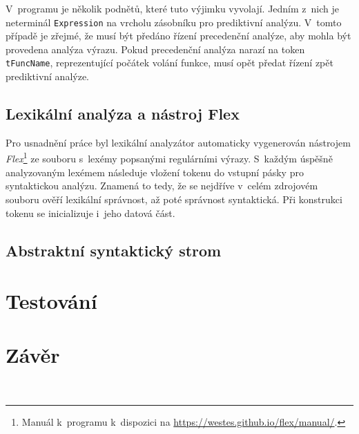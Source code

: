 \begin{figure}
    \caption{}
    \label{fig_schema_zmeny_parseru}
\end{figure}

V~programu je několik podnětů, které tuto výjimku vyvolají.
Jedním z~nich je neterminál \texttt{Expression} na vrcholu zásobníku pro prediktivní analýzu.
V~tomto případě je zřejmé, že musí být předáno řízení precedenční analýze, aby mohla být provedena analýza výrazu.
Pokud precedenční analýza narazí na token \texttt{tFuncName}, reprezentující počátek volání funkce, musí opět předat řízení zpět prediktivní analýze.


\begin{figure}[h]
    \caption{}
\end{figure}

\section{Lexikální analýza a nástroj Flex}
Pro usnadnění práce byl lexikální analyzátor automaticky vygenerován nástrojem \emph{Flex}\footnote{Manuál k~programu k~dispozici na \href{https://westes.github.io/flex/manual/}{https://westes.github.io/flex/manual/}.} ze souboru s~lexémy popsanými regulárními výrazy.
S~každým úspěšně analyzovaným lexémem následuje vložení tokenu do vstupní pásky pro syntaktickou analýzu.
Znamená to tedy, že se nejdříve v~celém zdrojovém souboru ověří lexikální správnost, až poté správnost syntaktická. 
Při konstrukci tokenu se inicializuje i~jeho datová část.

\section{Abstraktní syntaktický strom}

\chapter{Testování}

\chapter{Závěr}\